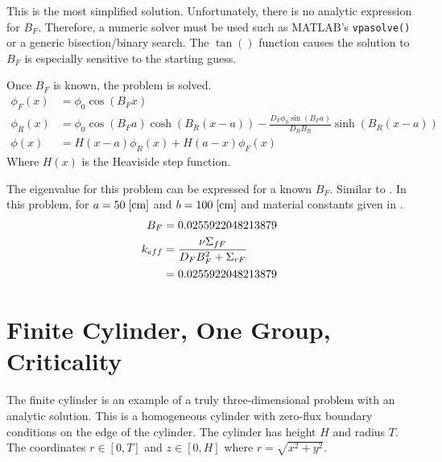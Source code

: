   This is the most simplified solution. Unfortunately, there is no analytic
  expression for $B_F$. Therefore, a numeric solver must be used such as 
  MATLAB's \verb|vpasolve()| or a generic bisection/binary search. The $\tan()$ 
  function causes the solution to $B_F$ is especially sensitive to the starting
  guess.
  
  Once $B_F$ is known, the problem is solved.
  \begin{align}
    \phi_F(x) &= \phi_0 \cos(B_F x)\\
    \phi_R(x) &= \phi_0 \cos(B_F a) \cosh(B_R (x-a)) 
      - \frac{D_F \phi_0 \sin(B_F a)}{D_R B_R} \sinh(B_R (x-a))\\
    \phi(x) &= H(x-a)\phi_R(x) + H(a-x)\phi_F(x)
  \end{align}
  Where $H(x)$ is the Heaviside step function.  
  
  The eigenvalue for this problem can be expressed for a known $B_F$. Similar 
  to . In this problem, for $a=50 \;\text{[{cm}]}$ and
  $b=100 \;\text{[{cm}]}$ and material constants given in .
  \begin{align}
    B_F &= 0.0255922048213879 \\
    k_{eff} &= \frac{\nu\Sigma_{fF}}{D_F B_F^2 + \Sigma_{rF}} \\
    &= 0.0255922048213879
  \end{align}
  
\section{Finite Cylinder, One Group, Criticality}
  \label{sec:deriv_finite_cyl}
  The finite cylinder is an example of a truly three-dimensional problem with
  an analytic solution. This is a homogeneous cylinder with zero-flux boundary
  conditions on the edge of the cylinder. The cylinder has height $H$ and 
  radius $T$. The coordinates $r\in[0,T]$ and $z\in[0,H]$ where 
  $r=\sqrt{x^2+y^2}$.
  
